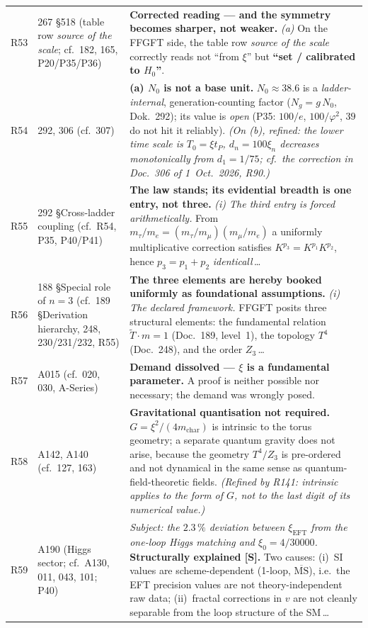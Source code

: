 \begin{longtable}{@{}p{0.9cm}p{3.1cm}p{10.2cm}@{}}
R53 & 267 \S518 (table row \emph{source of the scale}; cf.\ 182, 165, P20/P35/P36) & \textbf{Corrected reading --- and the symmetry becomes sharper, not weaker.} \emph{(a)} On the FFGFT side, the table row \emph{source of the scale} correctly reads not \enquote{from $\xi$} but \textbf{\enquote{set / calibrated to $H_0$}}. \\
R54 & 292, 306 (cf.\ 307) & \textbf{(a) $N_0$ is not a base unit.} $N_0\approx38.6$ is a \emph{ladder-internal}, generation-counting factor ($N_g=g\,N_0$, Dok.~292); its value is \emph{open} (P35: $100/e$, $100/\varphi^2$, $39$ do not hit it reliably). \emph{(On (b), refined: the lower time scale is $T_0=\xi t_P$, $d_n=100\xi_n$ decreases monotonically from $d_1=1/75$; cf.\ the correction in Doc.~306 of 1~Oct.~2026, R90.)} \\
R55 & 292 \S{}Cross-ladder coupling (cf.\ R54, P35, P40/P41) & \textbf{The law stands; its evidential breadth is one entry, not three.} \emph{(i) The third entry is forced arithmetically.} From $m_\tau/m_e=(m_\tau/m_\mu)(m_\mu/m_e)$ a uniformly multiplicative correction satisfies $K^{p_3}=K^{p_1}K^{p_2}$, hence $p_3=p_1+p_2$ \emph{identicall}\,\ldots \\
R56 & 188 \S{}Special role of $n=3$ (cf.\ 189 \S{}Derivation hierarchy, 248, 230/231/232, R55) & \textbf{The three elements are hereby booked uniformly as foundational assumptions.} \emph{(i) The declared framework.} FFGFT posits three structural elements: the fundamental relation $\tilde{T}\cdot m = 1$ (Doc.~189, level~1), the topology $T^4$ (Doc.~248), and the order $Z_3$\,\ldots \\
R57 & A015 (cf.\ 020, 030, A-Series) & \textbf{Demand dissolved --- $\xi$ is a fundamental parameter.} A proof is neither possible nor necessary; the demand was wrongly posed. \\
R58 & A142, A140 (cf.\ 127, 163) & \textbf{Gravitational quantisation not required.} $G=\xi^2/(4m_\text{char})$ is intrinsic to the torus geometry; a separate quantum gravity does not arise, because the geometry $T^4/Z_3$ is pre-ordered and not dynamical in the same sense as quantum-field-theoretic fields. \emph{(Refined by R141: intrinsic applies to the form of $G$, not to the last digit of its numerical value.)} \\
R59 & A190 (Higgs sector; cf.\ A130, 011, 043, 101; P40) & \emph{Subject: the $2.3\,\%$ deviation between $\xi_{\mathrm{EFT}}$ from the one-loop Higgs matching and $\xi_0=4/30000$.} \textbf{Structurally explained [S].} Two causes: (i)~SI values are scheme-dependent (1-loop, $\overline{\mathrm{MS}}$), i.e.\ the EFT precision values are not theory-independent raw data; (ii)~fractal corrections in $v$ are not cleanly separable from the loop structure of the SM\,\ldots \\

\end{longtable}
